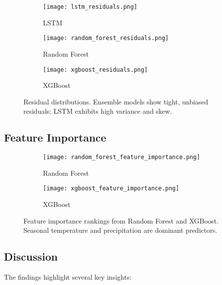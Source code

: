 \documentclass{article}
\begin{document}
\begin{figure} [H]
    \centering
    \begin{subfigure}{0.32\linewidth}
        \centering
        \texttt{[image: lstm\_residuals.png]}
        \caption{LSTM}
    \end{subfigure}
    \begin{subfigure}{0.32\linewidth}
        \centering
        \texttt{[image: random\_forest\_residuals.png]}
        \caption{Random Forest}
    \end{subfigure}
    \begin{subfigure}{0.32\linewidth}
        \centering
        \texttt{[image: xgboost\_residuals.png]}
        \caption{XGBoost}
    \end{subfigure}
    \caption{Residual distributions. Ensemble models show tight, unbiased residuals; LSTM exhibits high variance and skew.}
    \label{fig:residuals}
\end{figure}

\subsection{Feature Importance}

\begin{figure} [H]
    \centering
    \begin{subfigure}{0.48\linewidth}
        \centering
        \texttt{[image: random\_forest\_feature\_importance.png]}
        \caption{Random Forest}
    \end{subfigure}
    \begin{subfigure}{0.48\linewidth}
        \centering
        \texttt{[image: xgboost\_feature\_importance.png]}
        \caption{XGBoost}
    \end{subfigure}
    \caption{Feature importance rankings from Random Forest and XGBoost. Seasonal temperature and precipitation are dominant predictors.}
    \label{fig:feature_importance}
\end{figure}

\subsection{Discussion}

The findings highlight several key insights:
\end{document}
